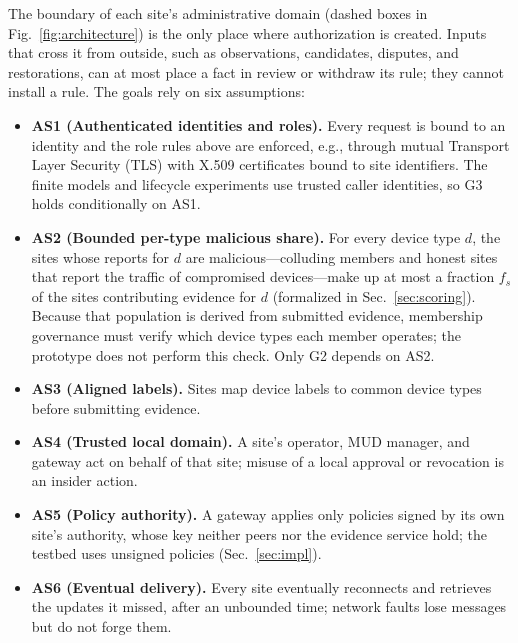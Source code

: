 \documentclass[journal]{IEEEtran}
\theoremstyle{definition}
\begin{document}
The boundary of each site's administrative domain (dashed boxes in Fig.~\ref{fig:architecture}) is the only place where authorization is created. Inputs that cross it from outside, such as observations, candidates, disputes, and restorations, can at most place a fact in review or withdraw its rule; they cannot install a rule. The goals rely on six assumptions:
\begin{itemize}
\item \textbf{AS1 (Authenticated identities and roles).} Every request is bound to an identity and the role rules above are enforced, e.g., through mutual Transport Layer Security (TLS) with X.509 certificates bound to site identifiers. The finite models and lifecycle experiments use trusted caller identities, so G3 holds conditionally on AS1.
\item \textbf{AS2 (Bounded per-type malicious share).} For every device type $d$, the sites whose reports for $d$ are malicious---colluding members and honest sites that report the traffic of compromised devices---make up at most a fraction $f_s$ of the sites contributing evidence for $d$ (formalized in Sec.~\ref{sec:scoring}). Because that population is derived from submitted evidence, membership governance must verify which device types each member operates; the prototype does not perform this check. Only G2 depends on AS2.
\item \textbf{AS3 (Aligned labels).} Sites map device labels to common device types before submitting evidence.
\item \textbf{AS4 (Trusted local domain).} A site's operator, MUD manager, and gateway act on behalf of that site; misuse of a local approval or revocation is an insider action.
\item \textbf{AS5 (Policy authority).} A gateway applies only policies signed by its own site's authority, whose key neither peers nor the evidence service hold; the testbed uses unsigned policies (Sec.~\ref{sec:impl}).
\item \textbf{AS6 (Eventual delivery).} Every site eventually reconnects and retrieves the updates it missed, after an unbounded time; network faults lose messages but do not forge them.
\end{itemize}
\end{document}

